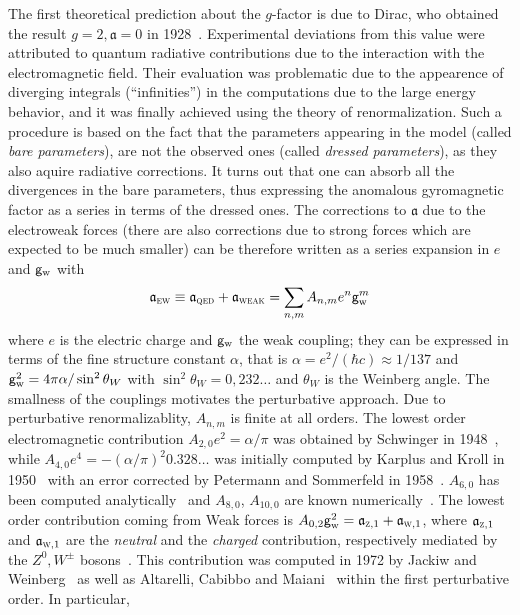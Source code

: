 \documentclass[a4paper, 11pt]{article}
\newcommand{\gyr}{\mathfrak{a}}								%
\theoremstyle{thm}
\begin{document}
The first theoretical prediction about the $g$-factor is due to Dirac, who obtained the result $g = 2, \gyr = 0$ in 1928~\cite{Dirac_1930}. Experimental deviations from this value were attributed to quantum radiative contributions due to the interaction with the electromagnetic field.
Their evaluation was problematic due to the appearence
of diverging integrals (``infinities'') in the computations due to the large energy behavior, and
it was finally achieved using the theory of renormalization.
Such a procedure is based on the fact that the parameters appearing in the model (called \emph{bare parameters}), are not the observed ones (called \emph{dressed parameters}), as they also aquire radiative corrections. It turns out that
one can absorb all the divergences in the bare parameters, thus
expressing the anomalous gyromagnetic factor as a series in terms of the dressed ones.
The corrections to $\gyr$ due to the electroweak forces (there are also corrections due to strong forces which are expected to be much smaller)
can be therefore written as a series expansion in $e$ and $\mathsf{g}_{\textup{w}}$ with 
\begin{equation} 
\label{eq:perturbative_expansion_g}
\gyr_{\textsc{ew}} \equiv \gyr_{\textsc{qed}} + \gyr_{\textsc{weak}} =\sum_{n,m} A_{n,m} e^n \mathsf{g}_{\textup{w}}^m
\end{equation}
where $e$ is the electric charge and $\mathsf{g}_{\textup{w}}$ the weak coupling; they can be expressed in terms
of the fine structure constant $\alpha$, that is $\alpha=e^2/(\hbar c) \approx 1/137$ and $\mathsf{g}_{\textup{w}}^2=4\pi \alpha/\sin^2 \theta_W$ with
$\sin^2\theta_W=0,232 \dots$ and $\theta_W$ is the Weinberg angle. The smallness of the couplings motivates the perturbative approach.
Due to perturbative renormalizablity, $A_{n,m}$ is finite at all orders. 
The lowest order electromagnetic contribution $A_{2,0} e^2=\alpha/\pi$
was obtained by Schwinger in 1948~\cite{Schwinger_1948}, while 
 $A_{4,0} e^4=-(\alpha/\pi)^2
0.328 \dots$ was initially computed by Karplus and Kroll in 1950~\cite{Karplus_Kroll_1950} with an error corrected by Petermann and Sommerfeld in 1958~\cite{Petermann_1958, Sommerfeld_1958}. 
$A_{6,0}$  has been computed analytically~\cite{Laporta_1996} and 
$A_{8,0}$, $A_{10,0}$
are known numerically~\cite{Aoyama_2012}. The lowest order contribution coming from
Weak forces is $A_{0,2}\mathsf{g}_{\textup{w}}^2=\gyr_{\textsc{z}, 1} +
\gyr_{\textsc{w}, 1}$, where $\gyr_{\textsc{z}, 1}$ and $\gyr_{\textsc{w}, 1}$ are the \emph{neutral} and the \emph{charged} contribution, respectively mediated by the $Z^0, W^\pm$ bosons~\cite{Weinberg_1964}. This contribution was computed in 1972 by Jackiw and Weinberg~\cite{Jackiw_Weinberg_1972} as well as Altarelli, Cabibbo and Maiani~\cite{Altarelli_1972} within the first perturbative order. In particular,
\end{document}
